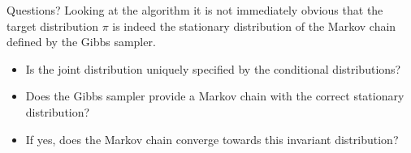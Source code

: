 \begin{frame}{Questions?}
    Looking at the algorithm it is not immediately obvious that the target 
    distribution $\pi$ is indeed the stationary distribution of the Markov 
    chain defined by the Gibbs sampler. 

    \begin{itemize}
        \item Is the joint distribution uniquely specified by the conditional distributions?
        \item Does the Gibbs sampler provide a Markov chain with the correct stationary distribution?
        \item If yes, does the Markov chain converge towards this invariant distribution?
    \end{itemize}
\end{frame}

